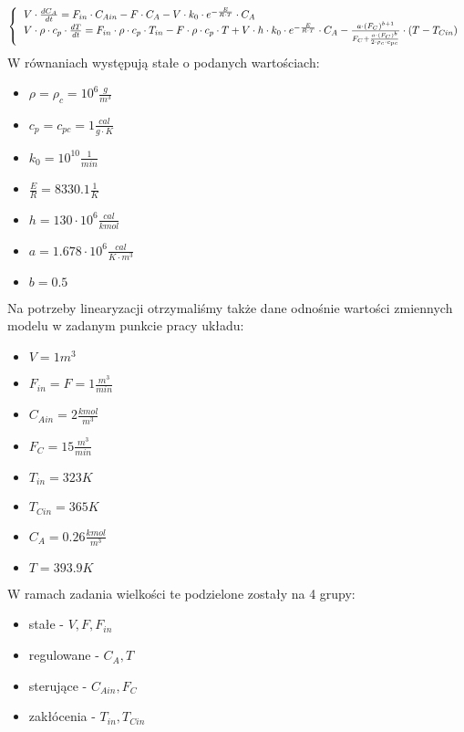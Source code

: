 \begin{equation}
	\left\{
	\begin{tabular}{l}
	$V \cdot \frac{dC_A}{dt}=F_{in} \cdot C_{Ain}-F \cdot C_A-V \cdot k_0 \cdot e^{-\frac{E}{R \cdot T}} \cdot C_A$\\
	$V \cdot \rho \cdot c_p \cdot \frac{dT}{dt}=F_{in} \cdot \rho \cdot c_p \cdot T_{in}-F \cdot \rho \cdot c_p \cdot T+V \cdot h \cdot k_0 \cdot e^{-\frac{E}{R \cdot T}} \cdot C_A - \frac{a \cdot (F_C)^{b+1}}{F_C+\frac{a \cdot (F_C)^b}{2 \cdot \rho_c \cdot c_{pc}}} \cdot (T-T_{Cin})$
	\end{tabular}
	\right.
\end{equation}
W równaniach występują stałe o podanych wartościach:\\
\begin{itemize}
	\item $\rho=\rho_c=10^6\frac{g}{m^3}$
	\item $c_p=c_{pc} = 1 \frac{cal}{g\cdot K}$
	\item $k_0 = 10^{10} \frac{1}{min}$
	\item $\frac{E}{R} = 8330.1 \frac{1}{K}$
	\item $h = 130\cdot 10^6 \frac{cal}{kmol}$
	\item $a = 1.678\cdot 10^6\frac{cal}{K\cdot m^3}$
	\item $b = 0.5$
\end{itemize}
Na potrzeby linearyzacji otrzymaliśmy także dane odnośnie wartości zmiennych modelu w zadanym punkcie pracy układu:\\
\begin{itemize}
	\item $V=1m^3$
	\item $F_{in} = F = 1 \frac{m^3}{min}$
	\item $C_{Ain} = 2 \frac{kmol}{m^3}$
	\item $F_C = 15 \frac{m^3}{min}$
	\item $T_{in} = 323K$
	\item $T_{Cin} = 365K$
	\item $C_A = 0.26\frac{kmol}{m^3}$
	\item $T = 393.9K$
\end{itemize}
W ramach zadania wielkości te podzielone zostały na 4 grupy:\\
\begin{itemize}
	\item stałe - $V,F,F_{in}$
	\item regulowane - $C_A,T$
	\item sterujące - $C_{Ain},F_C$
	\item zakłócenia - $T_{in},T_{Cin}$
\end{itemize}
